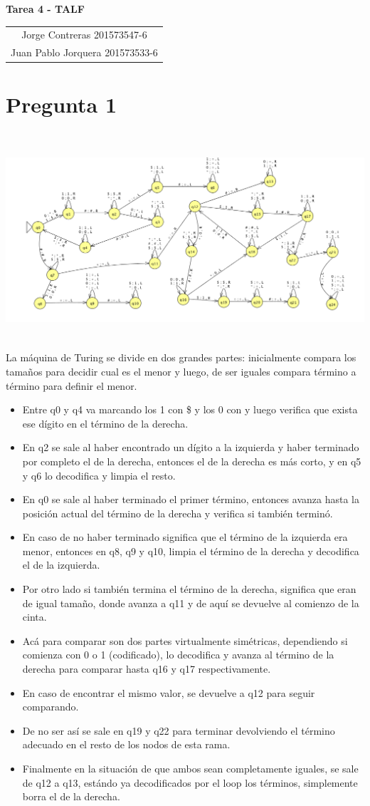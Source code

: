 \documentclass[11pt,letterpaper]{article}
\newcommand{\titulo}{Tarea 4 - TALF}
\newcommand{\integrantes}{\begin{tabular}{c}
Jorge Contreras 201573547-6 \\
Juan Pablo Jorquera  201573533-6 \\
\end{tabular}}
\renewcommand{\maketitle}
{
\thispagestyle{fancy}
\begin{center}
\begin{Large}
\textbf{\titulo}\\
\end{Large}
\vspace{0.5cm}
\integrantes
\end{center}
\vspace{0.3cm}
}
\begin{document}
\maketitle

\section{Pregunta 1}
\includegraphics[height=8cm]{p1.png}
La máquina de Turing se divide en dos grandes partes: inicialmente compara los tamaños para decidir cual es el menor y luego, de ser iguales compara término a término para definir el menor.
\begin{itemize}
	\item Entre q0 y q4 va marcando los 1 con \$ y los 0 con \* y luego verifica que exista ese dígito en el término de la derecha.
	\item En q2 se sale al haber encontrado un dígito a la izquierda y haber terminado por completo el de la derecha, entonces el de la derecha es más corto, y en q5 y q6 lo decodifica y limpia el resto.
	\item En q0 se sale al haber terminado el primer término, entonces avanza hasta la posición actual del término de la derecha y verifica si también terminó.
	\item En caso de no haber terminado significa que el término de la izquierda era menor, entonces en q8, q9 y q10, limpia el término de la derecha y decodifica el de la izquierda.
	\item Por otro lado si también termina el término de la derecha, significa que eran de igual tamaño, donde avanza a q11 y de aquí se devuelve al comienzo de la cinta.
	\item Acá para comparar son dos partes virtualmente simétricas, dependiendo si comienza con 0 o 1 (codificado), lo decodifica y avanza al término de la derecha para comparar hasta q16 y q17 respectivamente.
	\item En caso de encontrar el mismo valor, se devuelve a q12 para seguir comparando.
	\item De no ser así se sale en q19 y q22 para terminar devolviendo el término adecuado en el resto de los nodos de esta rama.
	\item Finalmente en la situación de que ambos sean completamente iguales, se sale de q12 a q13, estándo ya decodificados por el loop los términos, simplemente borra el de la derecha.
\end{itemize}
\end{document}

